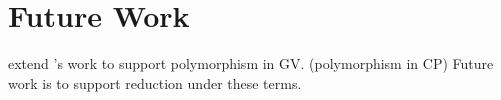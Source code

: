 \section{Future Work}

\citeauthor{??} extend \citeauthor{Wadler:2014}'s work to support polymorphism
in GV. (polymorphism in CP) Future work is to support reduction under these
terms.
